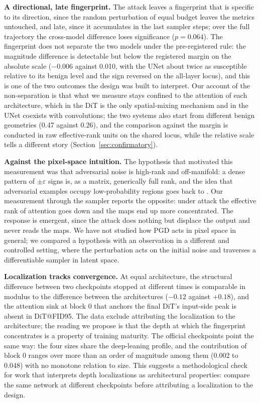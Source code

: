 \documentclass{article}
\begin{document}
\textbf{A directional, late fingerprint.} The attack leaves a fingerprint that is specific to its direction, since the random perturbation of equal budget leaves the metrics untouched, and late, since it accumulates in the last sampler steps; over the full trajectory the cross-model difference loses significance ($p = 0.064$). The fingerprint does not separate the two models under the pre-registered rule: the magnitude difference is detectable but below the registered margin on the absolute scale ($-0.006$ against 0.010, with the UNet about twice as susceptible relative to its benign level and the sign reversed on the all-layer locus), and this is one of the two outcomes the design was built to interpret. Our account of the non-separation is that what we measure stays confined to the attention of each architecture, which in the DiT is the only spatial-mixing mechanism and in the UNet coexists with convolutions; the two systems also start from different benign geometries (0.47 against 0.26), and the comparison against the margin is conducted in raw effective-rank units on the shared locus, while the relative scale tells a different story (Section~\ref{sec:confirmatory}).

\textbf{Against the pixel-space intuition.} The hypothesis that motivated this measurement was that adversarial noise is high-rank and off-manifold: a dense pattern of $\pm\varepsilon$ signs is, as a matrix, generically full rank, and the idea that adversarial examples occupy low-probability regions goes back to \citet{szegedy2013intriguing}. Our measurement through the sampler reports the opposite: under attack the effective rank of attention goes down and the maps end up more concentrated. The response is emergent, since the attack does nothing but displace the output and never reads the maps. We have not studied how PGD acts in pixel space in general; we compared a hypothesis with an observation in a different and controlled setting, where the perturbation acts on the initial noise and traverses a differentiable sampler in latent space.

\textbf{Localization tracks convergence.} At equal architecture, the structural difference between two checkpoints stopped at different times is comparable in modulus to the difference between the architectures ($-0.12$ against $+0.18$), and the attention sink at block 0 that anchors the final DiT's input-side peak is absent in DiT@FID95. The data exclude attributing the localization to the architecture; the reading we propose is that the depth at which the fingerprint concentrates is a property of training maturity. The official checkpoints point the same way: the four sizes share the deep-leaning profile, and the contribution of block 0 ranges over more than an order of magnitude among them (0.002 to 0.048) with no monotone relation to size. This suggests a methodological check for work that interprets depth localizations as architectural properties: compare the same network at different checkpoints before attributing a localization to the design.
\end{document}
